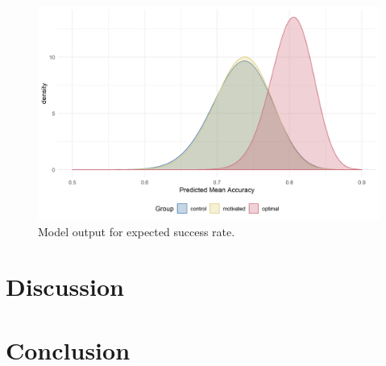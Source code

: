 \documentclass[12pt]{article}
\begin{document}
\begin{figure}[ht!]
	\includegraphics[scale=0.8]{../Figures/Model_stan_expacc.png}
	\centering
	\captionsetup{justification=centering}
	\caption{Model output for expected success rate.}
	\label{fig:Model_exp_acc}
\end{figure}

\section*{Discussion}

\section*{Conclusion}

\clearpage
\begingroup\onehalfspacing
\newpage
{}


\endgroup
\end{document}

